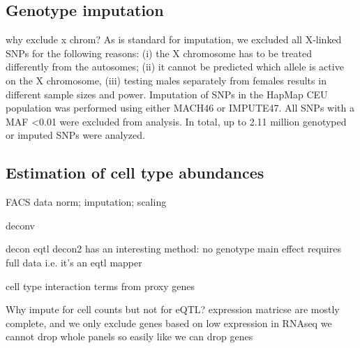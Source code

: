 \subsection{Genotype imputation}

why exclude x chrom?
As is standard for imputation, we excluded all X-linked SNPs for the following reasons: (i) the X chromosome has to be treated differently from the autosomes; (ii) it cannot be predicted which allele is active on the X chromosome, (iii) testing males separately from females results in different sample sizes and power. Imputation of SNPs in the HapMap CEU population was performed using either MACH46 or IMPUTE47. All SNPs with a MAF <0.01 were excluded from analysis. In total, up to 2.11 million genotyped or imputed SNPs were analyzed.

\subsection{Estimation of cell type abundances}


FACS data norm; imputation; scaling

deconv

    decon eqtl
        decon2 has an interesting method: no genotype main effect
        requires full data i.e. it's an eqtl mapper

    cell type interaction terms from proxy genes


Why impute for cell counts but not for eQTL?
expression matricse are mostly complete, and we only exclude genes based on low expression in RNAseq
we cannot drop whole panels so easily like we can drop genes


